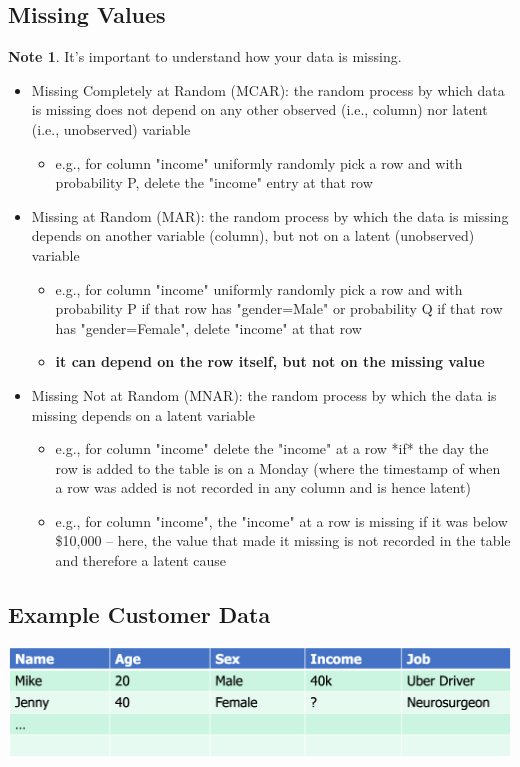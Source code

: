 \documentclass[11pt]{article}
\theoremstyle{definition}
\newtheorem{note}{Note}
\begin{document}
\subsection{Missing Values}
\begin{note}
    It's important to understand how your data is missing.
\end{note}
\begin{itemize}
    \item Missing Completely at Random (MCAR): the random process by which data is
    missing does not depend on any other observed (i.e., column) nor latent
    (i.e., unobserved) variable
    \begin{itemize}
        \item e.g., for column "income" uniformly randomly pick a row and with probability P, delete the
        "income" entry at that row
    \end{itemize}
    \item Missing at Random (MAR): the random process by which the data is missing
    depends on another variable (column), but not on a latent (unobserved) variable
    \begin{itemize}
        \item e.g., for column "income" uniformly randomly pick a row and with probability P if that row has
        "gender=Male" or probability Q if that row has "gender=Female", delete "income" at that row
        \item \textbf{it can depend on the row itself, but not on the missing value}
    \end{itemize}
    \item Missing Not at Random (MNAR): the random process by which the data is missing depends on a latent variable
    \begin{itemize}
        \item e.g., for column "income" delete the "income" at a row *if* the day the row is added to the
        table is on a Monday (where the timestamp of when a row was added is not recorded in any
        column and is hence latent)
        \item e.g., for column "income", the "income" at a row is missing if it was below \$10,000 – here, the
        value that made it missing is not recorded in the table and therefore a latent cause
    \end{itemize}
\end{itemize}
\subsection{Example Customer Data}
\includegraphics[width=\textwidth]{15.png}
\end{document}

